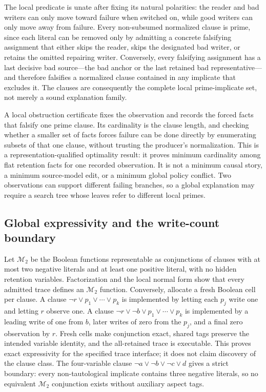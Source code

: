 The local predicate is unate after fixing its natural polarities: the reader and bad
writers can only move toward failure when switched on, while good writers can only
move away from failure.  Every non-subsumed normalized clause is prime, since each
literal can be removed only by admitting a concrete falsifying assignment that
either skips the reader, skips the designated bad writer, or retains the omitted
repairing writer.  Conversely, every falsifying assignment has a last decisive bad
source---the bad anchor or the last retained bad representative---and therefore
falsifies a normalized clause contained in any implicate that excludes it.  The
clauses are consequently the complete local prime-implicate set, not merely a sound
explanation family.

A local obstruction certificate fixes the observation and records the forced facts
that falsify one prime clause.  Its cardinality is the clause length, and checking
whether a smaller set of facts forces failure can be done directly by enumerating
subsets of that one clause, without trusting the producer's normalization.  This is
a representation-qualified optimality result: it proves minimum cardinality among
flat retention facts for one recorded observation.  It is not a minimum causal story,
a minimum source-model edit, or a minimum global policy conflict.  Two observations
can support different failing branches, so a global explanation may require a search
tree whose leaves refer to different local primes.

\subsection{Global expressivity and the write-count boundary}

Let $\mathcal{M}_2$ be the Boolean functions representable as conjunctions of
clauses with at most two negative literals and at least one positive literal, with
no hidden retention variables.  Factorization and the local normal form show that
every admitted trace defines an $\mathcal{M}_2$ function.  Conversely, allocate a
fresh Boolean cell per clause.  A clause $\neg r\lor p_1\lor\cdots\lor p_k$ is
implemented by letting each $p_j$ write one and letting $r$ observe one.  A clause
$\neg r\lor\neg b\lor p_1\lor\cdots\lor p_k$ is implemented by a leading write of
one from $b$, later writes of zero from the $p_j$, and a final zero observation by
$r$.  Fresh cells make conjunction exact, shared tags preserve the intended variable
identity, and the all-retained trace is executable.  This proves exact expressivity
for the specified trace interface; it does not claim discovery of the clause class.
The four-variable clause $\neg a\lor\neg b\lor\neg c\lor d$ gives a strict boundary:
every non-tautological implicate contains three negative literals, so no equivalent
$\mathcal{M}_2$ conjunction exists without auxiliary aspect tags.

